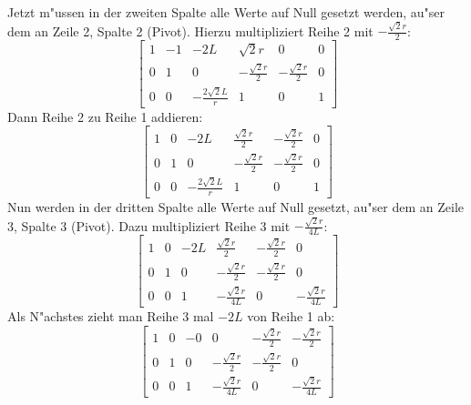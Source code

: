\documentclass[11pt]{article}
\begin{document}
    Jetzt m"ussen in der zweiten Spalte alle Werte auf Null gesetzt werden, au"ser dem an Zeile 2, Spalte 2 (Pivot).
    Hierzu multipliziert Reihe 2 mit $-\frac{\sqrt{2}r}{2}$:
    \begin{equation}
        \left[\begin{array}{ccc|ccc}
                  1 & -1 & -2L                   & \sqrt{2}r            & 0                    & 0 \\
                  0 & 1  & 0                     & -\frac{\sqrt{2}r}{2} & -\frac{\sqrt{2}r}{2} & 0 \\
                  0 & 0  & -\frac{2\sqrt{2}L}{r} & 1                    & 0                    & 1
        \end{array}\right]\label{eq:pivottwo}
    \end{equation}
    Dann Reihe 2 zu Reihe 1 addieren:
    \begin{equation}
        \left[\begin{array}{ccc|ccc}
                  1 & 0 & -2L                   & \frac{\sqrt{2}r}{2}  & -\frac{\sqrt{2}r}{2} & 0 \\
                  0 & 1 & 0                     & -\frac{\sqrt{2}r}{2} & -\frac{\sqrt{2}r}{2} & 0 \\
                  0 & 0 & -\frac{2\sqrt{2}L}{r} & 1                    & 0                    & 1
        \end{array}\right]\label{eq:r2tor1}
    \end{equation}
    Nun werden in der dritten Spalte alle Werte auf Null gesetzt, au"ser dem an Zeile 3, Spalte 3 (Pivot).
    Dazu multipliziert Reihe 3 mit $-\frac{\sqrt{2}r}{4L}$:
    \begin{equation}
        \left[\begin{array}{ccc|ccc}
                  1 & 0 & -2L & \frac{\sqrt{2}r}{2}   & -\frac{\sqrt{2}r}{2} & 0                     \\
                  0 & 1 & 0   & -\frac{\sqrt{2}r}{2}  & -\frac{\sqrt{2}r}{2} & 0                     \\
                  0 & 0 & 1   & -\frac{\sqrt{2}r}{4L} & 0                    & -\frac{\sqrt{2}r}{4L}
        \end{array}\right]\label{eq:pivot3}
    \end{equation}
    Als N"achstes zieht man Reihe 3 mal $-2L$ von Reihe 1 ab:
    \begin{equation}
        \left[\begin{array}{ccc|ccc}
                  1 & 0 & -0 & 0                     & -\frac{\sqrt{2}r}{2} & -\frac{\sqrt{2}r}{2}  \\
                  0 & 1 & 0  & -\frac{\sqrt{2}r}{2}  & -\frac{\sqrt{2}r}{2} & 0                     \\
                  0 & 0 & 1  & -\frac{\sqrt{2}r}{4L} & 0                    & -\frac{\sqrt{2}r}{4L}
        \end{array}\right]\label{eq:mult3p1}
    \end{equation}
\end{document}
